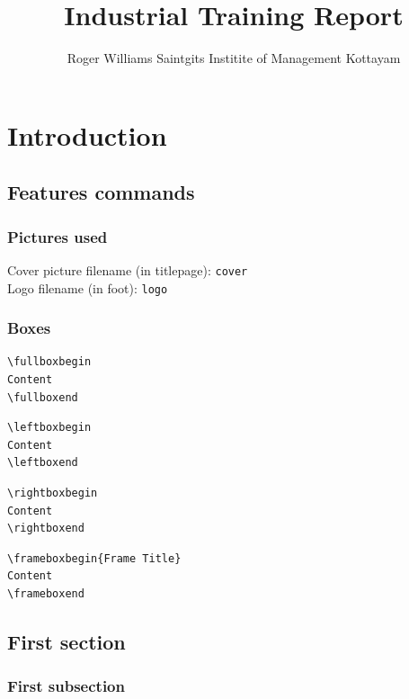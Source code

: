\documentclass[12pt]{report}
\title{Industrial Training Report}
\author{Roger Williams \newline  Saintgits Institite of Management Kottayam}
\date{}
\begin{document}
\maketitle

\tableofcontents
\clearpage
\chapter{Introduction}
\section{Features commands}

\subsection{Pictures used}

\noindent
Cover picture filename (in titlepage): \texttt{cover}\\
Logo filename (in foot): \texttt{logo}

\subsection{Boxes}

\begin{verbatim}
\fullboxbegin
Content
\fullboxend
\end{verbatim}

\begin{verbatim}
\leftboxbegin
Content
\leftboxend
\end{verbatim}

\begin{verbatim}
\rightboxbegin
Content
\rightboxend
\end{verbatim}

\begin{verbatim}
\frameboxbegin{Frame Title}
Content
\frameboxend
\end{verbatim}

\newpage

\section{First section}
\lipsum[1]

\fullboxbegin
\lipsum[1]
\fullboxend

\lipsum[1]

\subsection{First subsection}
\lipsum[1]
\end{document}
